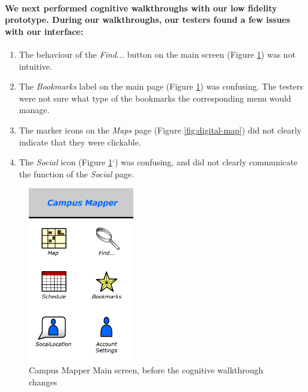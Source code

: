 \documentclass{report}
\begin{document}
    \paragraph{We next performed cognitive walkthroughs with our low fidelity
    prototype. During our walkthroughs, our testers found a few issues with our
    interface:}
    \begin{enumerate}
    \item The behaviour of the \emph{Find...} button on the main screen (Figure
    \ref{fig:digital-dashboard}) was not intuitive.
    \item The \emph{Bookmarks} label on the main page (Figure \ref{fig:digital-dashboard}) was
    confusing. The testers were not sure what type of the bookmarks the
    corresponding menu would manage.
    \item The marker icons on the \emph{Maps} page (Figure \ref{fig:digital-map}) did not clearly
    indicate that they were clickable.
    \item The \emph{Social} icon (Figure \ref{fig:digital-dashboard}`) was confusing, and did not
    clearly communicate the function of the \emph{Social} page.
    \end{enumerate}
    \begin{figure}
        \centering
            \includegraphics[height=3in]{img/dashboard.png}
        \caption{Campus Mapper Main screen, before the cognitive walkthrough changes} 
        \label{fig:digital-dashboard} 
    \end{figure}
\end{document}
